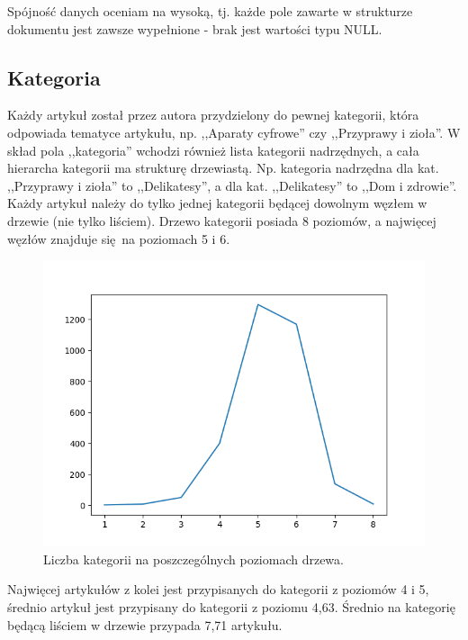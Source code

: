 \documentclass[pl]{minipw} %
\begin{document}
Spójność danych oceniam na wysoką, tj. każde pole zawarte w strukturze dokumentu jest zawsze wypełnione - brak jest wartości typu NULL.

\subsection{Kategoria}

Każdy artykuł został przez autora przydzielony do pewnej kategorii, która odpowiada tematyce artykułu, np. ,,Aparaty cyfrowe'' czy ,,Przyprawy i zioła''. W skład pola ,,kategoria'' wchodzi również lista kategorii nadrzędnych, a cała hierarcha kategorii ma strukturę drzewiastą. Np. kategoria nadrzędna dla kat. ,,Przyprawy i zioła'' to ,,Delikatesy'', a dla kat. ,,Delikatesy'' to  ,,Dom i zdrowie''. Każdy artykuł należy do tylko jednej kategorii będącej dowolnym węzłem w drzewie (nie tylko liściem). Drzewo kategorii posiada 8 poziomów, a najwięcej węzłów znajduje się na poziomach 5 i 6. 
\begin{figure}[H]
	\centering
	\includegraphics[width=1\textwidth]{img/categories_levels.png}
	\caption{Liczba kategorii na poszczególnych poziomach drzewa.}
\end{figure}
Najwięcej artykułów z kolei jest przypisanych do kategorii z poziomów 4 i 5, średnio artykuł jest przypisany do kategorii z poziomu 4,63. Średnio na kategorię będącą liściem w drzewie przypada 7,71 artykułu.
\end{document}

